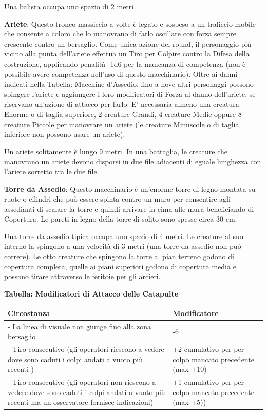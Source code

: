 \documentclass[a4paper,twoside,openany]{book}
\begin{document}
\begin{multicols}{2}
Una balista occupa uno spazio di 2 metri.

\textbf{Ariete}: Questo tronco massiccio a volte è legato e sospeso a un traliccio mobile che consente a coloro che lo manovrano di farlo oscillare con forza sempre crescente contro un bersaglio. Come unica azione del round, il personaggio più vicino alla punta dell'ariete effettua un Tiro per Colpire contro la Difesa della costruzione, applicando penalità -1d6 per la mancanza di competenza (non è possibile avere competenza nell'uso di questo macchinario). Oltre ai danni indicati nella Tabella: Macchine d'Assedio, fino a nove altri personaggi possono spingere l'ariete e aggiungere i loro modificatori di Forza al danno dell'ariete, se riservano un'azione di attacco per farlo. E' necessaria almeno una creatura Enorme o di taglia superiore, 2 creature Grandi, 4 creature Medie oppure 8 creature Piccole per manovrare un ariete (le creature Minuscole o di taglia inferiore non possono usare un ariete).

Un ariete solitamente è lungo 9 metri. In una battaglia, le creature che manovrano un ariete devono disporsi in due file adiacenti di eguale lunghezza con l'ariete sorretto tra le due file.

\textbf{Torre da Assedio}: Questo macchinario è un'enorme torre di legno montata su ruote o cilindri che può essere spinta contro un muro per consentire agli assedianti di scalare la torre e quindi arrivare in cima alle mura beneficiando di Copertura. Le pareti in legno della torre di solito sono spesse circa 30 cm.

Una torre da assedio tipica occupa uno spazio di 4 metri. Le creature al suo interno la spingono a una velocità di 3 metri (una torre da assedio non può correre). Le otto creature che spingono la torre al pian terreno godono di copertura completa, quelle ai piani superiori godono di copertura media e possono tirare attraverso le feritoie per gli arcieri.

\end{multicols}

\medskip

\textbf{Tabella: Modificatori di Attacco delle Catapulte}

\medskip

\begin{tabular}{p{}p{}}
\textbf{Circostanza}  & \textbf{Modificatore}\\
\toprule
- La linea di visuale non giunge fino alla zona bersaglio & -6\\
- Tiro consecutivo (gli operatori riescono a vedere dove sono caduti i colpi andati a vuoto più recenti )  & +2 cumulativo per per colpo mancato precedente (max +10)\\
- Tiro consecutivo (gli operatori non riescono a vedere dove sono caduti i colpi andati a vuoto più recenti ma un osservatore fornisce indicazioni) & +1 cumulativo per per colpo mancato precedente (max +5))\\
\end{tabular}
\end{document}
